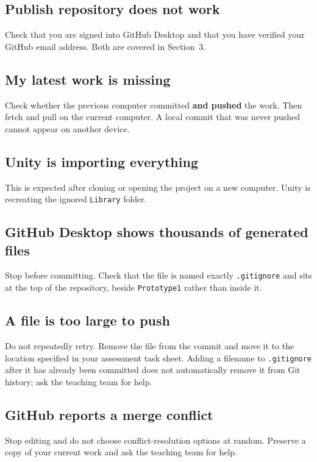 \documentclass[11pt,a4paper]{article}
\newcommand{\pathbit}[1]{\texttt{#1}}
\begin{document}
\subsection*{Publish repository does not work}
Check that you are signed into GitHub Desktop and that you have verified your GitHub email
address. Both are covered in Section~3.

\subsection*{My latest work is missing}
Check whether the previous computer committed \textbf{and pushed} the work. Then fetch and
pull on the current computer. A local commit that was never pushed cannot appear on
another device.

\subsection*{Unity is importing everything}
This is expected after cloning or opening the project on a new computer. Unity is
recreating the ignored \pathbit{Library} folder.

\subsection*{GitHub Desktop shows thousands of generated files}
Stop before committing. Check that the file is named exactly \pathbit{.gitignore} and sits
at the top of the repository, beside \pathbit{Prototype1} rather than inside it.

\subsection*{A file is too large to push}
Do not repeatedly retry. Remove the file from the commit and move it to the location
specified in your assessment task sheet. Adding a filename to \pathbit{.gitignore} after
it has already been committed does not automatically remove it from Git history; ask the
teaching team for help.

\subsection*{GitHub reports a merge conflict}
Stop editing and do not choose conflict-resolution options at random. Preserve a copy of
your current work and ask the teaching team for help.

\end{document}
